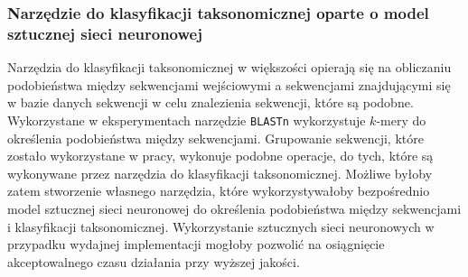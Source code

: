 \documentclass{article}
\newcommand{\temporary}[1]{
    \begin{tcolorbox}[colframe=red, colback=white, title={\textbf{WERSJA PO POLSKU}}, sharp corners=south]
        #1
    \end{tcolorbox}
}
\begin{document}
            \temporary{
                \subsubsection{Narzędzie do klasyfikacji taksonomicznej oparte o model sztucznej sieci neuronowej}

                Narzędzia do klasyfikacji taksonomicznej w większości opierają się na obliczaniu podobieństwa między sekwencjami wejściowymi a sekwencjami znajdującymi się w bazie danych sekwencji w celu znalezienia sekwencji, które są podobne. Wykorzystane w eksperymentach narzędzie \texttt{BLASTn} wykorzystuje $k$-mery do określenia podobieństwa między sekwencjami. 
                Grupowanie sekwencji, które zostało wykorzystane w pracy, wykonuje podobne operacje, do tych, które są wykonywane przez narzędzia do klasyfikacji taksonomicznej. Możliwe byłoby zatem stworzenie własnego narzędzia, które wykorzystywałoby bezpośrednio model sztucznej sieci neuronowej do określenia podobieństwa między sekwencjami i klasyfikacji taksonomicznej. Wykorzystanie sztucznych sieci neuronowych w przypadku wydajnej implementacji mogłoby pozwolić na osiągnięcie akceptowalnego czasu działania przy wyższej jakości.
            }
\end{document}
